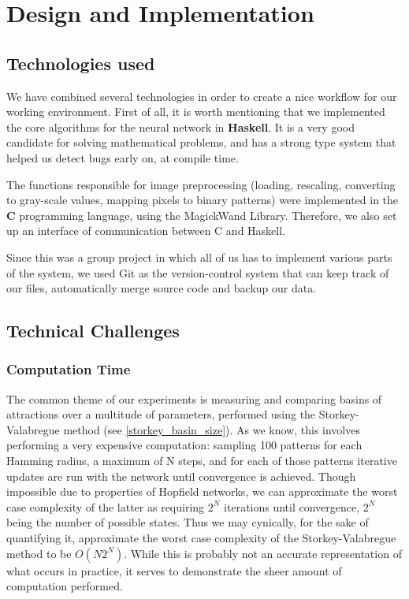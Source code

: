 \chapter{Design and Implementation}

\section{Technologies used}

We have combined several technologies in order to create a nice workflow for our working environment. First of all, it is worth mentioning that we implemented the core algorithms for the neural network in \textbf{Haskell}. It is a very good candidate for solving mathematical problems, and has a strong type system that helped us detect bugs early on, at compile time.

The functions responsible for image preprocessing (loading, rescaling, converting to gray-scale values, mapping pixels to binary patterns) were implemented in the \textbf{C} programming language, using the MagickWand Library. Therefore, we also set up an interface of communication between C and Haskell.

Since this was a group project in which all of us has to implement various parts of the system, we used Git as the version-control system that can keep track of our files, automatically merge source code and backup our data. 





\section{Technical Challenges}

\subsection{Computation Time}


The common theme of our experiments is measuring and comparing basins of attractions over a multitude of parameters, performed using the Storkey-Valabregue method (see \ref{storkey_basin_size}). As we know, this involves performing a very expensive computation: sampling 100 patterns for each Hamming radius, a maximum of N steps, and for each of those patterns iterative updates are run with the network until convergence is achieved. Though impossible due to properties of Hopfield networks, we can approximate the worst case complexity of the latter as requiring $2^N$ iterations until convergence, $2^N$ being the number of possible states. Thus we may cynically, for the sake of quantifying it, approximate the worst case complexity of the Storkey-Valabregue method to be $O(N2^N)$. While this is probably not an accurate representation of what occurs in practice, it serves to demonstrate the sheer amount of computation performed.

